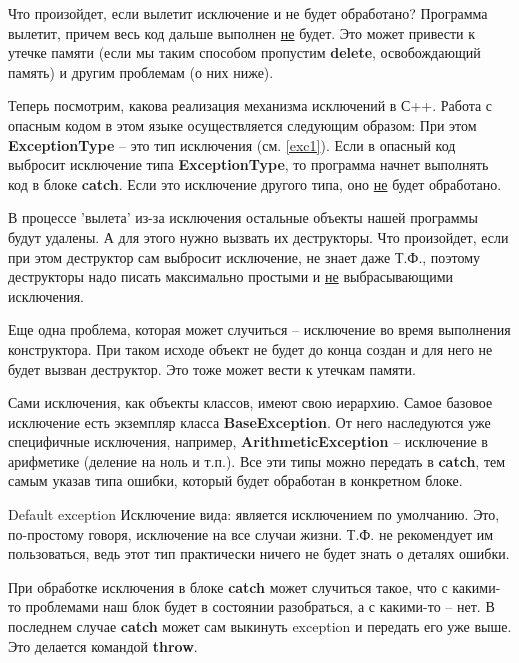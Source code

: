 \begin{lecture}[\lectureSubject]
\begin{lecSection}
	\end{lecSection}
	\begin{lecSection}
		Что произойдет, если вылетит исключение и не будет обработано? Программа вылетит, причем весь код дальше выполнен \underline{не} будет. Это может привести к утечке памяти (если мы таким способом пропустим \textbf{delete}, освобождающий память) и другим проблемам (о них ниже).
	\end{lecSection}
	\begin{lecSection}
		Теперь посмотрим, какова реализация механизма исключений в С++. Работа с опасным кодом в этом языке осуществляется следующим образом:
		При этом \textbf{ExceptionType} -- это тип исключения (см. \ref{exc1}). Если в опасный код выбросит исключение типа \textbf{ExceptionType}, то программа начнет выполнять код в блоке \textbf{catch}. Если это исключение другого типа, оно \underline{не} будет обработано.
	\end{lecSection}
	\begin{lecSection}
		В процессе 'вылета' из-за исключения остальные объекты нашей программы будут удалены. А для этого нужно вызвать их деструкторы. Что произойдет, если при этом деструктор сам выбросит исключение, не знает даже Т.Ф., поэтому деструкторы надо писать максимально простыми и \underline{не} выбрасывающими исключения.
		
		Еще одна проблема, которая может случиться -- исключение во время выполнения конструктора. При таком исходе объект не будет до конца создан и для него не будет вызван деструктор. Это тоже может вести к утечкам памяти.
	\end{lecSection}
	\begin{lecSection}
		Сами исключения, как объекты классов, имеют свою иерархию. Самое базовое исключение есть экземпляр класса \textbf{BaseException}. От него наследуются уже специфичные исключения, например, \textbf{ArithmeticException} -- исключение в арифметике (деление на ноль и т.п.). Все эти типы можно передать в \textbf{catch}, тем самым указав типа ошибки, который будет обработан в конкретном блоке.
		\begin{lecSubsection}{Default exception}
			Исключение вида:
			является исключением по умолчанию. Это, по-простому говоря, исключение на все случаи жизни. Т.Ф. не рекомендует им пользоваться, ведь этот тип практически ничего не будет знать о деталях ошибки.
		\end{lecSubsection}
	\end{lecSection}
	\begin{lecSection}
		При обработке исключения в блоке \textbf{catch} может случиться такое, что с какими-то проблемами наш блок будет в состоянии разобраться, а с какими-то -- нет. В последнем случае \textbf{catch} может сам выкинуть exception и передать его уже выше. Это делается командой \textbf{throw}.
	\end{lecSection}
\end{lecture}

